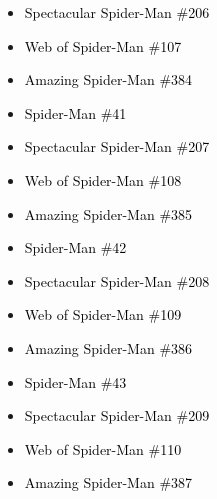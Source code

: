 \documentclass[12pt]{article}
\newcommand{\checkbox}{\raisebox{0.0ex}{\fbox{\rule{0ex}{1.5ex} \rule{1.5ex}{0ex}}}}
\begin{document}
\begin{center}
\begin{tcolorbox}[colback=white!95!gray, colframe=black, width=0.9\textwidth, arc=4mm, auto outer arc, boxrule=0.8pt]
\begin{itemize}[left=0pt,label={\checkbox}]
    \item \textcolor{black}{Spectacular Spider-Man \#206}
    \item \textcolor{black}{Web of Spider-Man \#107}
    \item \textcolor{black}{Amazing Spider-Man \#384}
    \item \textcolor{black}{Spider-Man \#41}
    \item \textcolor{black}{Spectacular Spider-Man \#207}
    \item \textcolor{black}{Web of Spider-Man \#108}
    \item \textcolor{black}{Amazing Spider-Man \#385}
    \item \textcolor{black}{Spider-Man \#42}
    \item \textcolor{black}{Spectacular Spider-Man \#208}
    \item \textcolor{black}{Web of Spider-Man \#109}
    \item \textcolor{black}{Amazing Spider-Man \#386}
    \item \textcolor{black}{Spider-Man \#43}
    \item \textcolor{black}{Spectacular Spider-Man \#209}
    \item \textcolor{black}{Web of Spider-Man \#110}
    \item \textcolor{black}{Amazing Spider-Man \#387}
\end{itemize}
\end{tcolorbox}
\end{center}
\end{document}
